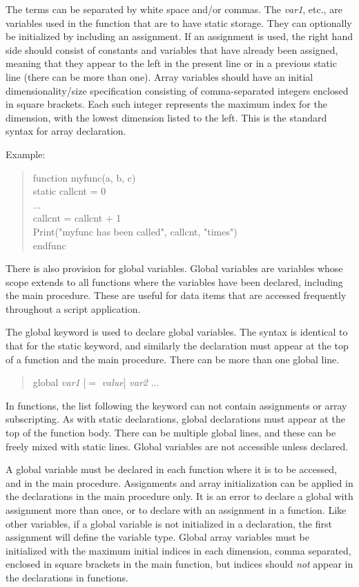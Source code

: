 The terms can be separated by white space and/or commas.  The {\it
var1}, etc., are variables used in the function that are to have
static storage.  They can optionally be initialized by including an
assignment.  If an assignment is used, the right hand side should
consist of constants and variables that have already been assigned,
meaning that they appear to the left in the present line or in a
previous {\vt static} line (there can be more than one).  Array
variables should have an initial dimensionality/size specification
consisting of comma-separated integers enclosed in square brackets. 
Each such integer represents the maximum index for the dimension, with
the lowest dimension listed to the left.  This is the standard syntax
for array declaration.

Example:
\begin{quote}\vt
function myfunc(a, b, c)\\
static callcnt = 0\\
...\\
callcnt = callcnt + 1\\
Print("myfunc has been called", callcnt, "times")\\
endfunc\\
\end{quote}

There is also provision for global variables.  Global variables are
variables whose scope extends to all functions where the variables
have been declared, including the main procedure.  These are useful
for data items that are accessed frequently throughout a script
application.

The {\vt global} keyword is used to declare global variables.  The
syntax is identical to that for the {\vt static} keyword, and
similarly the declaration must appear at the top of a function and the
main procedure.  There can be more than one {\vt global} line.
\begin{quote}
{\vt global} {\it var1} $[=$ {\it value\/}$]$ {\it var2} ...
\end{quote}

In functions, the list following the keyword can not contain
assignments or array subscripting.  As with {\vt static} declarations,
{\vt global} declarations must appear at the top of the function body. 
There can be multiple {\vt global} lines, and these can be freely
mixed with {\vt static} lines.  Global variables are not accessible
unless declared.

A global variable must be declared in each function where it is to be
accessed, and in the main procedure.  Assignments and array
initialization can be applied in the declarations in the main
procedure only.  It is an error to declare a global with assignment
more than once, or to declare with an assignment in a function.  Like
other variables, if a global variable is not initialized in a
declaration, the first assignment will define the variable type. 
Global array variables must be initialized with the maximum initial
indices in each dimension, comma separated, enclosed in square
brackets in the main function, but indices should {\it not} appear in
the declarations in functions.

